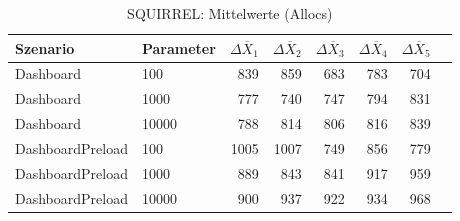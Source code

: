 
\begin{table}[ht]
\setlength{\extrarowheight}{-1pt}
\centering
\caption{SQUIRREL: Mittelwerte (Allocs)}
\begin{tabular}{llrrrrrr}
\toprule
Szenario & Parameter & ${\Delta \overline{X}_1}$ & ${\Delta \overline{X}_2}$ & ${\Delta \overline{X}_3}$ & ${\Delta \overline{X}_4}$ & ${\Delta \overline{X}_5}$ \\
\midrule
	Dashboard & 100 & 839 & 859 & 683 & 783 & 704 \\
	Dashboard & 1000 & 777 & 740 & 747 & 794 & 831 \\
	Dashboard & 10000 & 788 & 814 & 806 & 816 & 839 \\
	DashboardPreload & 100 & 1005 & 1007 & 749 & 856 & 779 \\
	DashboardPreload & 1000 & 889 & 843 & 841 & 917 & 959 \\
	DashboardPreload & 10000 & 900 & 937 & 922 & 934 & 968 \\
\bottomrule
\end{tabular}
\label{tab:mittelwerte_squirrel_allocs}
\end{table}
	